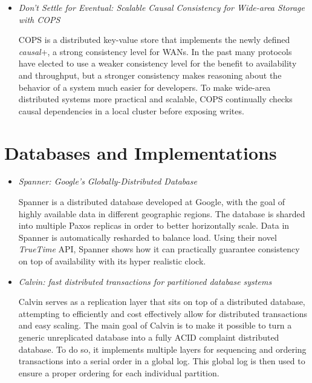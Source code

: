 \documentclass{article}
\begin{document}
\begin{itemize}
	\item
	\textit{Don't Settle for Eventual: Scalable Causal Consistency for Wide-area Storage with COPS} \cite{LloydCOPS}

	COPS is a distributed key-value store that implements the newly defined \textit{causal}+, a strong consistency level for WANs.
	In the past many protocols have elected to use a weaker consistency level for the benefit to availability and throughput, but a stronger consistency makes reasoning about the behavior of a system much easier for developers.
	To make wide-area distributed systems more practical and scalable, COPS continually checks causal dependencies in a local cluster before exposing writes.



\end{itemize}

\section{Databases and Implementations}

\begin{itemize}

	\item
	\textit{Spanner: Google's Globally-Distributed Database} \cite{Spanner}

	Spanner is a distributed database developed at Google, with the goal of highly available data in different geographic regions.
	The database is sharded into multiple Paxos replicas in order to better horizontally scale. Data in Spanner is automatically resharded to balance load.
	Using their novel \textit{TrueTime} API, Spanner shows how it can practically guarantee consistency on top of availability with its hyper realistic clock.

	\item
	\textit{Calvin: fast distributed transactions for partitioned database systems} \cite{Calvin}

	Calvin serves as a replication layer that sits on top of a distributed database, attempting to efficiently and cost effectively allow for distributed transactions and easy scaling. The main goal of Calvin is to make it possible to turn a generic unreplicated database into a fully ACID complaint distributed database.
	To do so, it implements multiple layers for sequencing and ordering transactions into a serial order in a global log. This global log is then used to ensure a proper ordering for each individual partition.

\end{itemize}
\end{document}
